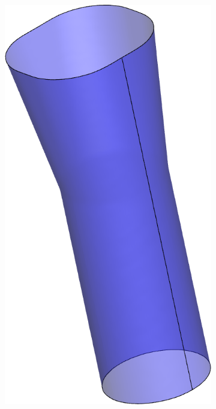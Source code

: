 \documentclass[8pt, aspectratio=169]{beamer}
\begin{document}
\begin{frame}
\begin{figure}
\begin{subfigure}{.3\textwidth}
		\end{subfigure}
		\begin{subfigure}{.3\textwidth}
			\includegraphics[height=.7\textheight]{../tec/holes/15.png}
		\end{subfigure}
		\begin{subfigure}{.3\textwidth}
			
		\end{subfigure}
	\end{figure}
\end{frame}
\end{document}
